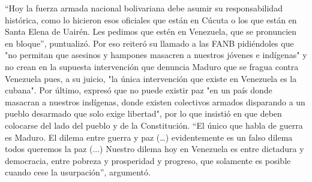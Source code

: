 \documentclass{article}%
\begin{document}
\newline%
%
“Hoy la fuerza armada nacional bolivariana debe asumir su responsabilidad histórica, como lo hicieron esos oficiales que están en Cúcuta o los que están en Santa Elena de Uairén. Les pedimos que estén en Venezuela, que se pronuncien en bloque”, puntualizó.%
\newline%
%
Por eso reiteró su llamado a las FANB pidiéndoles que "no permitan que asesinos y hampones masacren a nuestros jóvenes e indígenas" y no crean en la supuesta intervención que denuncia Maduro que se fragua contra Venezuela pues, a su juicio, "la única intervención que existe en Venezuela es la cubana".%
\newline%
%
Por último, expresó que no puede existir paz "en un país donde masacran a nuestros indígenas, donde existen colectivos armados disparando a un pueblo desarmado que solo exige libertad", por lo que insistió en que deben colocarse del lado del pueblo y de la Constitución.%
\newline%
%
“El único que habla de guerra es Maduro. El dilema entre guerra y paz (…) evidentemente es un falso dilema todos queremos la paz (...) Nuestro dilema hoy en Venezuela es entre dictadura y democracia, entre pobreza y prosperidad y progreso, que solamente es posible cuando cese la usurpación”, argumentó.%
\newline%
%
\end{document}
